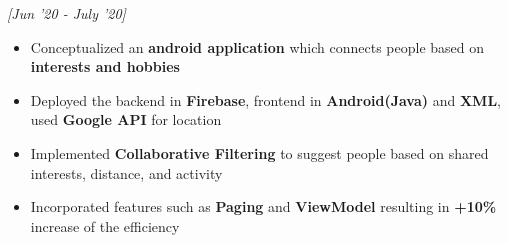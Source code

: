 \documentclass[10pt]{article}
\begin{document}
 \hfill{\sl \small [Jun '20 - July '20]} 
\vspace{-7pt}
\begin{itemize}[itemsep = -0.75mm]
    
    \item Conceptualized an \textbf{android application} which connects people based on \textbf{interests and hobbies}
    \item Deployed the backend in \textbf{Firebase}, frontend in \textbf{Android(Java)} and \textbf{XML}, used \textbf{Google API} for location
     \item Implemented  \textbf{Collaborative Filtering} to suggest people based on shared interests, distance, and activity
     \item Incorporated features such as \textbf{Paging} and \textbf{ViewModel} resulting in \textbf{+10\%} increase of the efficiency
     
     
\end{itemize}
\end{document}
